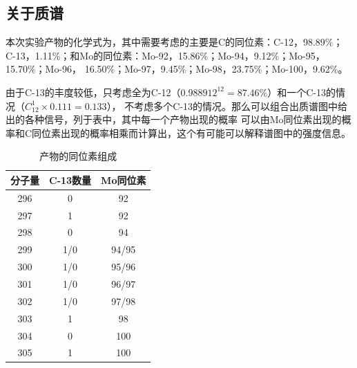 \documentclass[a4paper,zihao=5,UTF8]{ctexart}
\begin{document}
	\subsection{关于质谱}
	本次实验产物的化学式为，其中需要考虑的主要是C的同位素：C-12，98.89\%；
	C-13，1.11\%；和Mo的同位素：Mo-92，15.86\%；Mo-94，9.12\%；Mo-95，15.70\%；Mo-96，
	16.50\%；Mo-97，9.45\%；Mo-98，23.75\%；Mo-100，9.62\%。
	\par 
	由于C-13的丰度较低，只考虑全为C-12（$0.988912^{12} = 87.46\%$）和一个C-13的情况（$C_{12}^{1}\times 0.111 = 0.133$），
	不考虑多个C-13的情况。那么可以组合出质谱图中给出的各种信号，列于表中，其中每一个产物出现的概率
	可以由Mo同位素出现的概率和C同位素出现的概率相乘而计算出，这个有可能可以解释谱图中的强度信息。
	\begin{table}[htbp]
		\centering
		\caption{产物的同位素组成}
		\label{iso}
		\begin{tabular}{ccc}
			\toprule
			分子量 & C-13数量 & Mo同位素 \\
			\midrule
			296	& 0 & 92 \\
			297	& 1	& 92 \\
			298	& 0	& 94 \\
			299	& 1/0 & 94/95 \\
			300	& 1/0 & 95/96 \\
			301	& 1/0 & 96/97 \\
			302 & 1/0 & 97/98 \\
			303	& 1 & 98 \\
			304	& 0 & 100 \\
			305	& 1	& 100\\
			\bottomrule
		\end{tabular}
	\end{table}
    
	
\end{document}
